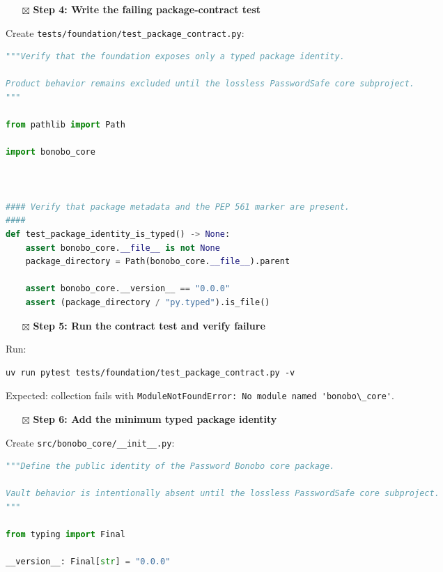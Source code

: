 \documentclass[
  letterpaper,
]{article}
\newcommand{\passthrough}[1]{#1}
\providecommand{\tightlist}{%
  \setlength{\itemsep}{0pt}\setlength{\parskip}{0pt}}
\begin{document}
\begin{itemize}
\tightlist
\item[$\boxtimes$]
  \textbf{Step 4: Write the failing package-contract test}
\end{itemize}

Create \nolinkurl{tests/foundation/test_package_contract.py}:

\begin{lstlisting}[language=Python]
"""Verify that the foundation exposes only a typed package identity.

Product behavior remains excluded until the lossless PasswordSafe core subproject.
"""

from pathlib import Path

import bonobo_core



#### Verify that package metadata and the PEP 561 marker are present.
####
def test_package_identity_is_typed() -> None:
    assert bonobo_core.__file__ is not None
    package_directory = Path(bonobo_core.__file__).parent

    assert bonobo_core.__version__ == "0.0.0"
    assert (package_directory / "py.typed").is_file()
\end{lstlisting}

\begin{itemize}
\tightlist
\item[$\boxtimes$]
  \textbf{Step 5: Run the contract test and verify failure}
\end{itemize}

Run:

\begin{lstlisting}
uv run pytest tests/foundation/test_package_contract.py -v
\end{lstlisting}

Expected: collection fails with \passthrough{\lstinline!ModuleNotFoundError: No module named 'bonobo\_core'!}.

\begin{itemize}
\tightlist
\item[$\boxtimes$]
  \textbf{Step 6: Add the minimum typed package identity}
\end{itemize}

Create \nolinkurl{src/bonobo_core/__init__.py}:

\begin{lstlisting}[language=Python]
"""Define the public identity of the Password Bonobo core package.

Vault behavior is intentionally absent until the lossless PasswordSafe core subproject.
"""

from typing import Final

__version__: Final[str] = "0.0.0"
\end{lstlisting}
\end{document}
